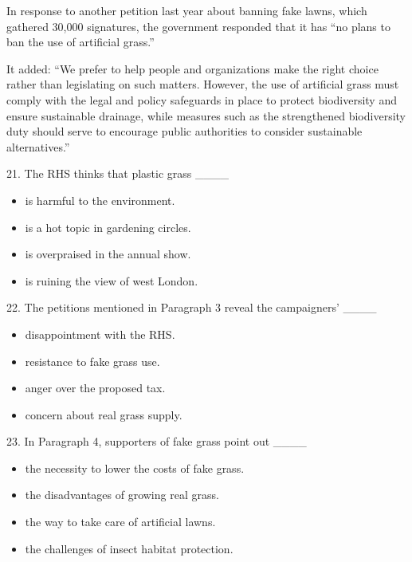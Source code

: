 \documentclass[UTF8,11pt]{ctexart}
\begin{document}
In response to another petition last year about banning fake lawns, which gathered 30,000 signatures, the government responded that it has “no plans to ban the use of artificial grass.”


It added: “We prefer to help people and organizations make the right choice rather than legislating on such matters. However, the use of artificial grass must comply with the legal and policy safeguards in place to protect biodiversity and ensure sustainable drainage, while measures such as the strengthened biodiversity duty should serve to encourage public authorities to consider sustainable alternatives.”


21. The RHS thinks that plastic grass \_\_\_\_


\begin{itemize}[leftmargin=2em,itemsep=.2em,topsep=.4em]\item[A.] is harmful to the environment.
\item[B.] is a hot topic in gardening circles.
\item[C.] is overpraised in the annual show.
\item[D.] is ruining the view of west London.
\end{itemize}

22. The petitions mentioned in Paragraph 3 reveal the campaigners’ \_\_\_\_


\begin{itemize}[leftmargin=2em,itemsep=.2em,topsep=.4em]\item[A.] disappointment with the RHS.
\item[B.] resistance to fake grass use.
\item[C.] anger over the proposed tax.
\item[D.] concern about real grass supply.
\end{itemize}

23. In Paragraph 4, supporters of fake grass point out \_\_\_\_


\begin{itemize}[leftmargin=2em,itemsep=.2em,topsep=.4em]\item[A.] the necessity to lower the costs of fake grass.
\item[B.] the disadvantages of growing real grass.
\item[C.] the way to take care of artificial lawns.
\item[D.] the challenges of insect habitat protection.
\end{itemize}
\end{document}
